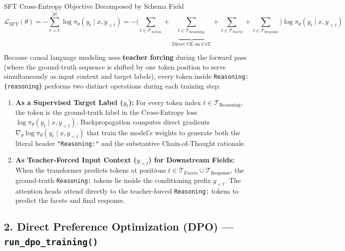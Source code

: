 \documentclass[10pt,letterpaper]{article}
\begin{document}
\begin{mathbox}{SFT Cross-Entropy Objective Decomposed by Schema Field}
\begin{equation}
\mathcal{L}_{\text{SFT}}(\theta) = -\sum_{t=1}^{|y|} \log \pi_\theta(y_t \mid x, y_{<t}) = -\Bigg( \sum_{t \in \mathcal{T}_{\text{Action}}} + \underbrace{\sum_{t \in \mathcal{T}_{\text{Reasoning}}}}_{\text{Direct CE on CoT}} + \sum_{t \in \mathcal{T}_{\text{Facets}}} + \sum_{t \in \mathcal{T}_{\text{Response}}} \Bigg) \log \pi_\theta(y_t \mid x, y_{<t})
\end{equation}
\end{mathbox}

Because causal language modeling uses \textbf{teacher forcing} during the forward pass (where the ground-truth sequence is shifted by one token position to serve simultaneously as input context and target labels), every token inside \texttt{Reasoning: \{reasoning\}} performs two distinct operations during each training step:
\begin{enumerate}[leftmargin=18pt, itemsep=2pt]
    \item \textbf{As a Supervised Target Label ($y_t$):} For every token index $t \in \mathcal{T}_{\text{Reasoning}}$, the token is the ground-truth label in the Cross-Entropy loss $\log \pi_\theta(y_t \mid x, y_{<t})$. Backpropagation computes direct gradients $\nabla_\theta \log \pi_\theta(y_t \mid x, y_{<t})$ that train the model's weights to generate both the literal header \texttt{"Reasoning:"} and the substantive Chain-of-Thought rationale.
    \item \textbf{As Teacher-Forced Input Context ($y_{<t}$) for Downstream Fields:} When the transformer predicts tokens at positions $t \in \mathcal{T}_{\text{Facets}} \cup \mathcal{T}_{\text{Response}}$, the ground-truth \texttt{Reasoning:} tokens lie inside the conditioning prefix $y_{<t}$. The attention heads attend directly to the teacher-forced \texttt{Reasoning:} tokens to predict the facets and final response.
\end{enumerate}

\vspace{6pt}
\subsection{2. Direct Preference Optimization (DPO) --- \texttt{run\_dpo\_training()}}
\end{document}
